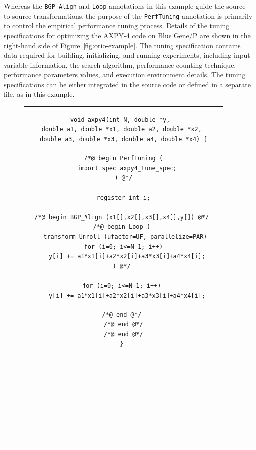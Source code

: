Whereas the \texttt{BGP\_Align} and \texttt{Loop} annotations in this example
guide the source-to-source transformations, the purpose of the
\texttt{PerfTuning} annotation is primarily to control the empirical
performance tuning process. Details of the tuning specifications for
optimizing the AXPY-4 code on Blue Gene/P are shown in the right-hand side of
Figure~\ref{fig:orio-example}.  The tuning specification contains data
required for building, initializing, and running experiments, including input
variable information, the search algorithm, performance counting technique,
performance parameters values, and execution environment details.  The tuning
specifications can be either integrated in the source code or defined in a
separate file, as in this example.

\begin{figure}%
\centering 
\begin{tabular}{cc} 
\begin{minipage}{.5\textwidth}  
\scriptsize
\begin{verbatim}  
 void axpy4(int N, double *y, 
  double a1, double *x1, double a2, double *x2, 
  double a3, double *x3, double a4, double *x4) {

  /*@ begin PerfTuning (
    import spec axpy4_tune_spec;
  ) @*/

  register int i;

  /*@ begin BGP_Align (x1[],x2[],x3[],x4[],y[]) @*/ 
  /*@ begin Loop ( 
   transform Unroll (ufactor=UF, parallelize=PAR)
   for (i=0; i<=N-1; i++) 
     y[i] += a1*x1[i]+a2*x2[i]+a3*x3[i]+a4*x4[i]; 
  ) @*/ 

  for (i=0; i<=N-1; i++) 
    y[i] += a1*x1[i]+a2*x2[i]+a3*x3[i]+a4*x4[i];

  /*@ end @*/ 
  /*@ end @*/
  /*@ end @*/
 }










\end{verbatim}
\end{minipage}
\end{tabular}
\end{figure}

